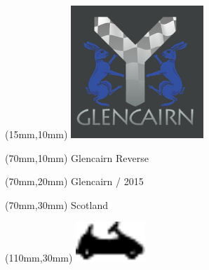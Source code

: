 \null\newpage
\begin{textblock*}{50mm}(15mm,10mm)%
\includegraphics[width=50mm]{LG/GLCN.png}
\end{textblock*}
\begin{textblock*}{130mm}(70mm,10mm)%
{\fontsize{20}{20}\selectfont Glencairn Reverse}\\
\end{textblock*}
\begin{textblock*}{120mm}(70mm,20mm)%
{\fontsize{16}{16}\selectfont Glencairn / 2015}\\
\end{textblock*}
\begin{textblock*}{120mm}(70mm,30mm)%
{\fontsize{12}{12}\selectfont Scotland}
\end{textblock*}
\begin{textblock*}{30mm}(110mm,30mm)%
\centering
\includegraphics[height=15mm]{icons/kart.pdf}
\end{textblock*}
